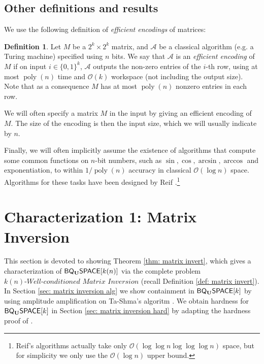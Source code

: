\documentclass[11pt]{article}
\theoremstyle{definition}
\newtheorem{definition}[theorem]{Definition}
\theoremstyle{remark}
\newcommand\matrixinvert[1]{{\ensuremath{#1}}\textit{-Well-conditioned Matrix Inversion}}
\newcommand{\classfont}{\sf}
\newcommand{\Unitary}{\mathbf{U}}
\newcommand{\unitaryBQSPACE}[1]{{\classfont{BQ}_\Unitary\classfont{SPACE}}[#1]}
\newcommand\bigoh{\mathcal{O}}
\DeclareMathOperator{\poly}{poly}
\begin{document}
\subsection{Other definitions and results}
We use the following definition of \emph{efficient encodings} of matrices:
\begin{definition}\label{def: efficient encoding}Let $M$ be a $2^{k} \times 2^{k}$ matrix, and $\mathcal{A}$ be a classical algorithm (e.g. a Turing machine) specified using $n$ bits. We say that $\mathcal{A}$ is an \emph{efficient encoding} of $M$ if on input $i\in\{0,1\}^k$, $\mathcal{A}$ outputs the non-zero entries of the $i$-th row, using at most $\poly(n)$ time and $\bigoh(k)$ workspace (not including the output size). Note that as a consequence $M$ has at most $\poly(n)$ nonzero entries in each row.
\end{definition}
We will often specify a matrix $M$ in the input by giving an efficient encoding of $M$. The size of the encoding is then the input size, which we will usually indicate by $n$.

Finally, we will often implicitly assume the existence of  algorithms that compute some common functions on $n$-bit numbers, such as $\sin,\cos,\arcsin,\arccos$ and exponentiation, to within $1/\poly(n)$ accuracy in classical $\bigoh (\log{n})$ space.  Algorithms for these tasks have been designed by Reif \cite{reif}.\footnote{Reif's algorithms actually take only $\bigoh (\log\log{n}\log\log\log{n})$ space, but for simplicity we only use the $\bigoh (\log{n})$ upper bound.}

\section{Characterization 1: Matrix Inversion}
This section is devoted to showing Theorem \ref{thm: matrix invert}, which gives a characterization of $\unitaryBQSPACE{k(n)}$ via the complete problem $\matrixinvert{k(n)}$ (recall Definition \ref{def: matrix invert}). In Section \ref{sec: matrix inversion alg} we show containment in $\unitaryBQSPACE{k}$ by using amplitude amplification on Ta-Shma's algoritm \cite{tashma}. We obtain hardness for $\unitaryBQSPACE{k}$ in Section \ref{sec: matrix inversion hard} by adapting the hardness proof of \cite{HHL}. %
\end{document}
